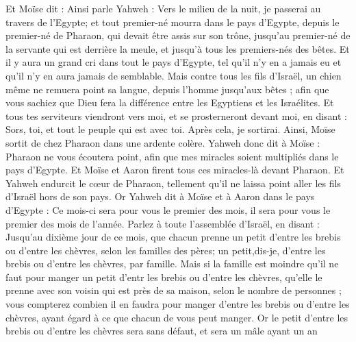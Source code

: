 \begin{multicols}{2}
Et Moïse dit : Ainsi parle Yahweh : Vers le milieu de la nuit, je passerai au travers de l'Egypte;
et tout premier-né mourra dans le pays d'Egypte, depuis le premier-né de Pharaon, qui devait être assis sur son trône, jusqu'au premier-né de la servante qui est derrière la meule, et jusqu’à tous les premiers-nés des bêtes.
Et il y aura un grand cri dans tout le pays d'Egypte, tel qu'il n'y en a jamais eu et qu’il n'y en aura jamais de semblable.
Mais contre tous les fils d'Israël, un chien même ne remuera point sa langue, depuis l'homme jusqu’aux bêtes ; afin que vous sachiez que Dieu fera la différence entre les Egyptiens et les Israélites.
Et tous tes serviteurs viendront vers moi, et se prosterneront devant moi, en disant : Sors, toi, et tout le peuple qui est avec toi. Après cela, je sortirai. Ainsi, Moïse sortit de chez Pharaon dans une ardente colère.
Yahweh donc dit à Moïse : Pharaon ne vous écoutera point, afin que mes miracles soient multipliés dans le pays d'Egypte.
Et Moïse et Aaron firent tous ces miracles-là devant Pharaon. Et Yahweh endurcit le cœur de Pharaon, tellement qu'il ne laissa point aller les fils d'Israël hors de son pays.
\VerseOne{}Or Yahweh dit à Moïse et à Aaron dans le pays d'Egypte :
Ce mois-ci sera pour vous le premier des mois, il sera pour vous le premier des mois de l'année.
Parlez à toute l'assemblée d'Israël, en disant : Jusqu'au dixième jour de ce mois, que chacun prenne un petit d'entre les brebis ou d'entre les chèvres, selon les familles des pères; un petit,dis-je, d'entre les brebis ou d'entre les chèvres, par famille.
Mais si la famille est moindre qu'il ne faut pour manger un petit d'entr les brebis ou d'entre les chèvres, qu'elle le prenne avec son voisin qui est près de sa maison, selon le nombre de personnes ; vous compterez combien il en faudra pour manger d'entre les brebis ou d'entre les chèvres, ayant égard à  ce que chacun de vous peut manger.
Or le petit d'entre les brebis ou d'entre les chèvres  sera  sans défaut, et sera un mâle ayant un an
\end{multicols}
